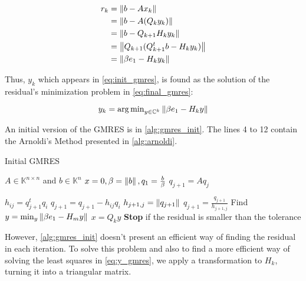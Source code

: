 \begin{align} \label{eq:final_gmres}
    \begin{split}
        r_{k} &= \left\lVert b - Ax_{k}\right\rVert\\
        &= \left\lVert b - A(Q_{k}y_{k})\right\rVert\\
        &= \left\lVert b-Q_{k+1}H_{k}y_{k}\right\rVert \\
        &= \left\lVert Q_{k+1}(Q_{k+1}^{t}b-H_{k}y_{k})\right\rVert \\
        &= \left\lVert\beta e_{1} - H_{k}y_{k}\right\rVert
    \end{split}
\end{align}


Thus, $y_{k}$ which appears in \ref{eq:init_gmres}, is found as the solution of the residual's minimization problem  in \ref{eq:final_gmres}:

\begin{equation}\label{eq:y_gmres}
    y_{k} = \operatorname{arg\,min}_{y \in \mathbb{C}^{k}} \left\lVert\beta e_{1} - H_{k}y\right\rVert
\end{equation}

An initial version of the GMRES is in \ref{alg:gmres_init}. The lines 4 to 12 contain the Arnoldi's Method presented in \ref{alg:arnoldi}.

\begin{algorithm}
    \caption{Initial GMRES}\label{alg:gmres_init}
    \begin{algorithmic}[1]
        \State $A \in \mathbb{K}^{n \times n}$ and $b\in \mathbb{K}^{n}$
        \State $x=0, \beta=\left\lVert b\right\rVert,q_{1}=\frac{b}{\beta}$
        \State $q_{j+1} = Aq_{j}$

        \State $h_{ij}= q_{j+1}^{t}q_{i}$
        \State $q_{j+1} = q_{j+1} - h_{ij}q_{i}$
        \EndFor
        \State $h_{j+1,j}=\left\lVert q_{j+1}\right\rVert$
        \State $q_{j+1} = \frac{q_{j+1}}{h_{j+1,j}}$
        \EndFor
        \State Find $y = \min_{y} \left\lVert\beta e_{1} - H_{m}y\right\rVert$
        \State $x = Q_{k}y$
        \State \textbf{Stop} if the residual is smaller than the tolerance
        \EndFor
    \end{algorithmic}
\end{algorithm}

However, \ref{alg:gmres_init} doesn't present an efficient way of finding the residual in each iteration. To solve this problem and also to find a more efficient way of solving the least squares in \ref{eq:y_gmres}, we apply a transformation to $H_{k}$, turning it into a triangular matrix.

